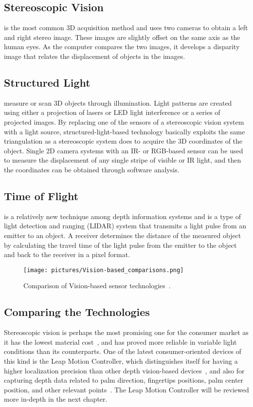 \subsection{Stereoscopic Vision}
is the most common 3D acquisition method and uses two cameras to obtain a left and right stereo image. 
These images are slightly offset on the same axis as the human eyes. As the computer compares the two images, 
it develops a disparity image that relates the displacement of objects in the images.

\subsection{Structured Light}
measure or scan 3D objects through illumination. Light patterns are created using either a projection of lasers or LED light 
interference or a series of projected images. 
By replacing one of the sensors of a stereoscopic vision system with a light source, structured-light-based technology basically exploits the same triangulation as a 
stereoscopic system does to acquire the 3D coordinates of the object. 
Single 2D camera systems with an IR- or RGB-based sensor can be used to measure the displacement of any single stripe of visible or IR light, 
and then the coordinates can be obtained through software analysis.

\subsection{Time of Flight}
is a relatively new technique among depth information systems
and is a type of light detection and ranging (LIDAR) system that transmits a light pulse from an emitter to an object. 
A receiver determines the distance of the measured object by calculating the travel time of the light pulse from the emitter to the object and back to the receiver 
in a pixel format.

\begin{figure}%
	\texttt{[image: pictures/Vision-based\_comparisons.png]}
	\caption{Comparison of Vision-based sensor technologies~\citep{Ko2012}.}
	\label{fig:VBComparisions}
\end{figure} 

\subsection{Comparing the Technologies} 
Stereoscopic vision is perhaps the most promising one for the consumer market as it has the lowest material cost~\citep{Ko2012}, 
and has proved more reliable in variable light conditions than its counterparts. 
One of the latest consumer-oriented devices of this kind is the Leap Motion Controller, 
which distinguishes itself for having a higher localization precision than other depth vision-based devices~\citep{Weichert2013}, 
and also for capturing depth data related to palm direction, fingertips positions, palm center position, and other relevant points~\citep{Wei2016}. 
The Leap Motion Controller will be reviewed more in-depth in the next chapter. 
